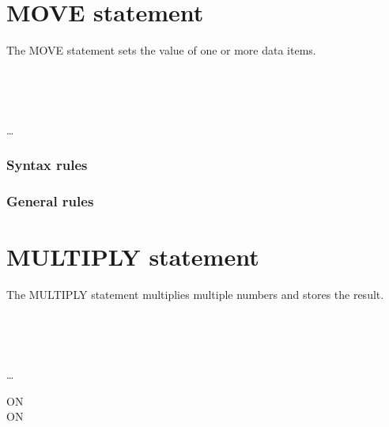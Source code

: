 \section{MOVE statement}

The MOVE statement sets the value of one or more data items.

\begin{syntax}
  \begin{0-1}
     \\
  \end{0-1}
  \begin{1=}
    \identifier \\
    \literal
  \end{1=}
  \begin{1=}
    \identifier
  \end{1=} \ldots
\end{syntax}

\subsubsection{Syntax rules}

\subsubsection{General rules}

\section{MULTIPLY statement}

The MULTIPLY statement multiplies multiple numbers and stores the result.

\begin{syntax}
  \begin{1=}
    \identifier \\
    \literal
  \end{1=}
  \begin{1=}
    \begin{1=}
      \identifier \\
      \literal
    \end{1=}
    \begin{0-1}
    \end{0-1}
  \end{1=} \ldots

  \begin{0+}
    ON   \imperativestatement \\
     ON   \imperativestatement
  \end{0+}

  \begin{0-1}
  \end{0-1}
\end{syntax}

